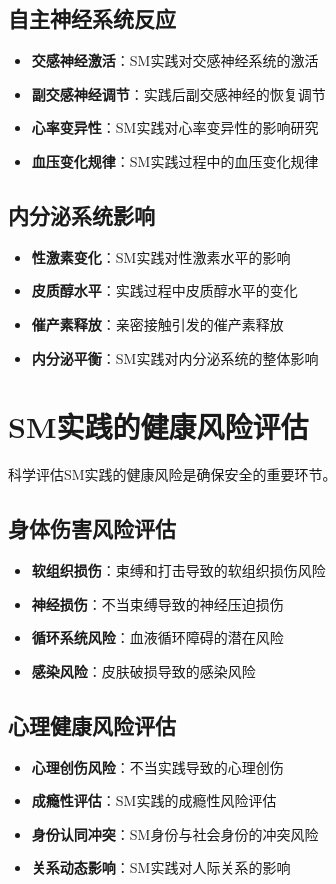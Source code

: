 \documentclass[12pt,UTF8]{ctexbook}
\begin{document}
\subsection{自主神经系统反应}
\begin{itemize}[leftmargin=2cm]
	\item \textbf{交感神经激活}：SM实践对交感神经系统的激活
	\item \textbf{副交感神经调节}：实践后副交感神经的恢复调节
	\item \textbf{心率变异性}：SM实践对心率变异性的影响研究
	\item \textbf{血压变化规律}：SM实践过程中的血压变化规律
\end{itemize}

\subsection{内分泌系统影响}
\begin{itemize}[leftmargin=2cm]
	\item \textbf{性激素变化}：SM实践对性激素水平的影响
	\item \textbf{皮质醇水平}：实践过程中皮质醇水平的变化
	\item \textbf{催产素释放}：亲密接触引发的催产素释放
	\item \textbf{内分泌平衡}：SM实践对内分泌系统的整体影响
\end{itemize}

\section{SM实践的健康风险评估}
科学评估SM实践的健康风险是确保安全的重要环节。

\subsection{身体伤害风险评估}
\begin{itemize}[leftmargin=2cm]
	\item \textbf{软组织损伤}：束缚和打击导致的软组织损伤风险
	\item \textbf{神经损伤}：不当束缚导致的神经压迫损伤
	\item \textbf{循环系统风险}：血液循环障碍的潜在风险
	\item \textbf{感染风险}：皮肤破损导致的感染风险
\end{itemize}

\subsection{心理健康风险评估}
\begin{itemize}[leftmargin=2cm]
	\item \textbf{心理创伤风险}：不当实践导致的心理创伤
	\item \textbf{成瘾性评估}：SM实践的成瘾性风险评估
	\item \textbf{身份认同冲突}：SM身份与社会身份的冲突风险
	\item \textbf{关系动态影响}：SM实践对人际关系的影响
\end{itemize}
\end{document}
